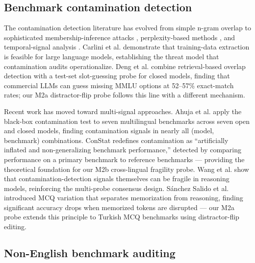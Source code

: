 \documentclass[11pt]{article}
\begin{document}
\subsection{Benchmark contamination detection}

The contamination detection literature has evolved from simple n-gram overlap \cite{brown2020gpt3} to sophisticated membership-inference attacks \cite{geng2022detecting}, perplexity-based methods \cite{oren2023proving}, and temporal-signal analysis \cite{zhang2025test}. Carlini et al. \cite{carlini2021extracting} demonstrate that training-data extraction is feasible for large language models, establishing the threat model that contamination audits operationalize. Deng et al. \cite{yang2024data} combine retrieval-based overlap detection with a test-set slot-guessing probe for closed models, finding that commercial LLMs can guess missing MMLU options at 52--57\% exact-match rates; our M2a distractor-flip probe follows this line with a different mechanism.

Recent work has moved toward multi-signal approaches. Ahuja et al. \cite{contammulti2024} apply the black-box contamination test \cite{oren2023proving} to seven multilingual benchmarks across seven open and closed models, finding contamination signals in nearly all (model, benchmark) combinations. ConStat \cite{constat2024} redefines contamination as ``artificially inflated and non-generalizing benchmark performance,'' detected by comparing performance on a primary benchmark to reference benchmarks --- providing the theoretical foundation for our M2b cross-lingual fragility probe. Wang et al. \cite{fragilereasoning2025} show that contamination-detection signals themselves can be fragile in reasoning models, reinforcing the multi-probe consensus design. S\'{a}nchez Salido et al. \cite{sanchz2025mcq} introduced MCQ variation that separates memorization from reasoning, finding significant accuracy drops when memorized tokens are disrupted --- our M2a probe extends this principle to Turkish MCQ benchmarks using distractor-flip editing.

\subsection{Non-English benchmark auditing}
\end{document}
